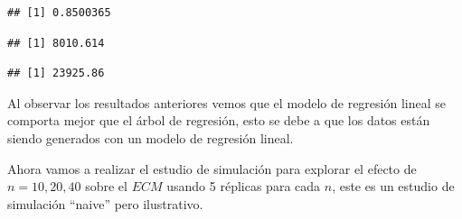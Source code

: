 \documentclass[]{book}
\makeatletter
\newenvironment{Shaded}{\begin{snugshade}}{\end{snugshade}}
\newcommand{\DecValTok}[1]{\textcolor[rgb]{0.00,0.00,0.81}{#1}}
\newcommand{\KeywordTok}[1]{\textcolor[rgb]{0.13,0.29,0.53}{\textbf{#1}}}
\newcommand{\NormalTok}[1]{#1}
\newcommand{\OperatorTok}[1]{\textcolor[rgb]{0.81,0.36,0.00}{\textbf{#1}}}
\newcommand{\StringTok}[1]{\textcolor[rgb]{0.31,0.60,0.02}{#1}}
\newenvironment{kframe}{%
\medskip{}
\setlength{\fboxsep}{.8em}
 \def\at@end@of@kframe{}%
 \ifinner\ifhmode%
  \def\at@end@of@kframe{\end{minipage}}%
  \begin{minipage}{\columnwidth}%
 \fi\fi%
 \def\FrameCommand##1{\hskip\@totalleftmargin \hskip-\fboxsep
 \colorbox{shadecolor}{##1}\hskip-\fboxsep
     \hskip-\linewidth \hskip-\@totalleftmargin \hskip\columnwidth}%
 \MakeFramed {\advance\hsize-\width
   \@totalleftmargin\z@ \linewidth\hsize
   \@setminipage}}%
 {\par\unskip\endMakeFramed%
 \at@end@of@kframe}
\renewenvironment{Shaded}{\begin{kframe}}{\end{kframe}}
\let\BeginKnitrBlock\begin \let\EndKnitrBlock\end
\makeatother
\begin{document}
\begin{verbatim}
## [1] 0.8500365
\end{verbatim}

\begin{Shaded}
\end{Shaded}

\begin{verbatim}
## [1] 8010.614
\end{verbatim}

\begin{Shaded}
\end{Shaded}

\begin{verbatim}
## [1] 23925.86
\end{verbatim}

\BeginKnitrBlock{rmdwarning}
Al observar los resultados anteriores vemos que el modelo de regresión lineal se comporta mejor que el árbol de regresión, esto se debe a que los datos están siendo generados con un modelo de regresión lineal.
\EndKnitrBlock{rmdwarning}

Ahora vamos a realizar el estudio de simulación para explorar el efecto de \(n = 10, 20, 40\) sobre el \(ECM\) usando 5 réplicas para cada \(n\), este es un estudio de simulación ``naive'' pero ilustrativo.
\end{document}
